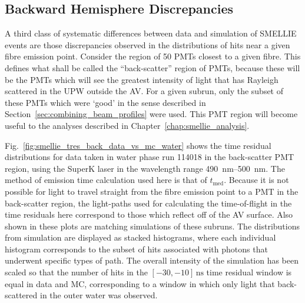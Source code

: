 \subsection{Backward Hemisphere Discrepancies}
A third class of systematic differences between data and simulation of SMELLIE events are those discrepancies observed in the distributions of hits near a given fibre emission point. Consider the region of 50 PMTs closest to a given fibre. This defines what shall be called the ``back-scatter'' region of PMTs, because these will be the PMTs which will see the greatest intensity of light that has Rayleigh scattered in the UPW outside the AV. For a given subrun, only the subset of these PMTs which were `good' in the sense described in Section~\ref{sec:combining_beam_profiles} were used. This PMT region will become useful to the analyses described in Chapter~\ref{chap:smellie_analysis}.

Fig.~\ref{fig:smellie_tres_back_data_vs_mc_water} shows the time residual distributions for data taken in water phase run \num{114018} in the back-scatter PMT region, using the SuperK laser in the wavelength range \SIrange{490}{500}{\nm}. The method of emission time calculation used here is that of $t_{\mathrm{med}}$. Because it is not possible for light to travel straight from the fibre emission point to a PMT in the back-scatter region, the light-paths used for calculating the time-of-flight in the time residuals here correspond to those which reflect off of the AV surface.  Also shown in these plots are matching simulations of these subruns. The distributions from simulation are displayed as stacked histograms, where each individual histogram corresponds to the subset of hits associated with photons that underwent specific types of path. The overall intensity of the simulation has been scaled so that the number of hits in the $[-30,-10]\,\si{\ns}$ time residual window is equal in data and MC, corresponding to a window in which only light that back-scattered in the outer water was observed.

